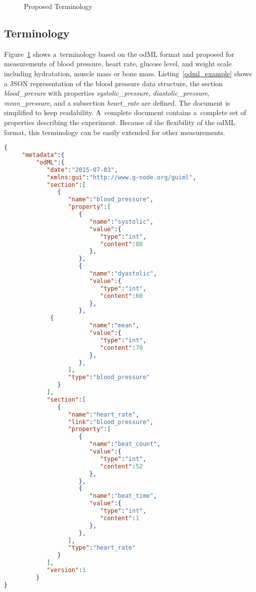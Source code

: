 \documentclass[a4paper,twoside]{article}
\begin{document}
\begin{figure}

  \centering
   {}
  \caption{Proposed Terminology}
  \label{fig:Terminology}
 \end{figure}


\subsection{Terminology}

Figure~\ref{fig:Terminology} shows a~terminology based on the odML format and proposed for measurements of blood pressure, heart rate, glucose level, and weight scale including hydratation, muscle mass or bone mass. Listing~\ref{odml_example} shows a JSON representation of the blood pressure data structure, the section \emph{blood\_presure} with properties \textit{systolic\_pressure}, \textit{diastolic\_pressure}, \textit{mean\_pressure}, and a subsection \textit{heart\_rate} are defined. The document is simplified to keep readability. A~complete document contains a~complete set of properties describing the experiment. Because of the flexibility of the odML format, this terminology can be easily extended for other measurements.

\begin{lstlisting}[language=json,caption=Blood pressure example, label=odml_example]
{
     "metadata":{
         "odML":{
            "date":"2015-07-03",
            "xmlns:gui":"http://www.g-node.org/guiml",
            "section":[
               {
                  "name":"blood_pressure",
                  "property":[
                     {
                        "name":"systolic",
                        "value":{
                           "type":"int",
                           "content":80
                        },
                     },
                     {
                        "name":"dyastolic",
                        "value":{
                           "type":"int",
                           "content":60
                        },
                     },
		     {
                        "name":"mean",
                        "value":{
                           "type":"int",
                           "content":70
                        },
                     },
                  ],
                  "type":"blood_pressure"
               }
            ],
            "section":[
               {
                  "name":"heart_rate",
                  "link":"blood_pressure",
                  "property":[
                     {
                        "name":"beat_count",
                        "value":{
                           "type":"int",
                           "content":52
                        },
                     },
                     {
                        "name":"beat_time",
                        "value":{
                           "type":"int",
                           "content":1
                        },
                     },
                  ],
                  "type":"heart_rate"
               }
            ],
            "version":1
         }
}
\end{lstlisting}
\end{document}
